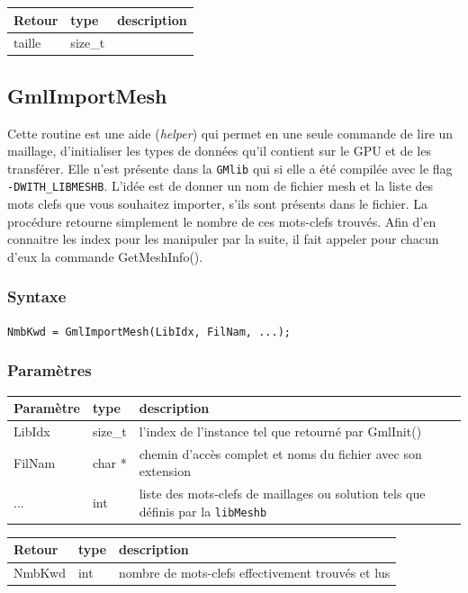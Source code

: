 \documentclass[a4paper,12pt]{article}
\begin{document}
\begin{tabular}{|m{2cm}|m{1.5cm}|m{10.5cm}|}
\hline
Retour     & type    & description \\
\hline
taille     & size\_t & \\
\hline
\end{tabular}


\subsection{GmlImportMesh}

Cette routine est une aide (\emph{helper}) qui permet en une seule commande de lire un maillage, d'initialiser les types de données qu'il contient sur le GPU et de les transférer.
Elle n'est présente dans la {\tt GMlib} qui si elle a été compilée avec le flag {\tt -DWITH\_LIBMESHB}.
L'idée est de donner un nom de fichier mesh et la liste des mots clefs que vous souhaitez importer, s'ils sont présents dans le fichier.
La procédure retourne simplement le nombre de ces mots-clefs trouvés.
Afin d'en connaitre les index pour les manipuler par la suite, il fait appeler pour chacun d'eux la commande GetMeshInfo().

\subsubsection*{Syntaxe}

{\tt NmbKwd = GmlImportMesh(LibIdx, FilNam, ...);}

\subsubsection*{Paramètres}

\begin{tabular}{|m{2cm}|m{1.5cm}|m{10.5cm}|}
\hline
Paramètre  & type    & description \\
\hline
LibIdx     & size\_t & l'index de l'instance tel que retourné par GmlInit() \\
\hline
FilNam     & char *  & chemin d'accès complet et noms du fichier avec son extension \\
\hline
...        & int     & liste des mots-clefs de maillages ou solution tels que définis par la {\tt libMeshb} \\
\hline
\end{tabular}

\medskip

\begin{tabular}{|m{2cm}|m{1.5cm}|m{10.5cm}|}
\hline
Retour     & type   & description \\
\hline
NmbKwd     & int    & nombre de mots-clefs effectivement trouvés et lus \\
\hline
\end{tabular}
\end{document}
